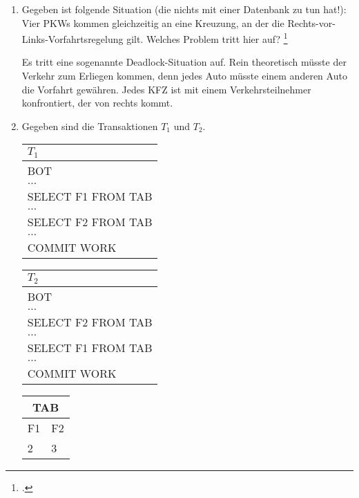 \documentclass{bschlangaul-aufgabe}
\begin{document}

\begin{enumerate}


\item Gegeben ist folgende Situation (die nichts mit einer Datenbank zu
tun hat!): Vier PKWs kommen gleichzeitig an eine Kreuzung, an der die
Rechts-vor-Links-Vorfahrtsregelung gilt. Welches Problem tritt hier auf?
\footcite[Aufgabe 6]{db:ab:6}

\begin{bAntwort}
Es tritt eine sogenannte Deadlock-Situation auf. Rein
theoretisch müsste der Verkehr zum Erliegen kommen, denn jedes Auto
müsste einem anderen Auto die Vorfahrt gewähren. Jedes KFZ ist mit einem
Verkehrsteilnehmer konfrontiert, der von rechts kommt.
\end{bAntwort}


\item Gegeben sind die Transaktionen $T_1$ und $T_2$.

\begin{center}
\begin{tabular}{|l|}
\hline
$T_1$ \\\hline
BOT \\\hline
$\dots$ \\\hline
SELECT F1 FROM TAB \\\hline
$\dots$ \\\hline
SELECT F2 FROM TAB \\\hline
$\dots$ \\\hline
COMMIT WORK \\\hline
\end{tabular}
%
\begin{tabular}{|l|}
\hline
$T_2$ \\\hline
BOT \\\hline
$\dots$ \\\hline
SELECT F2 FROM TAB \\\hline
$\dots$ \\\hline
SELECT F1 FROM TAB \\\hline
$\dots$ \\\hline
COMMIT WORK \\\hline
\end{tabular}
%
\begin{tabular}{|l|l|}
\hline
\multicolumn{2}{|c|}{TAB} \\\hline
F1 & F2 \\\hline
2 & 3 \\\hline
\end{tabular}
\end{center}


\end{enumerate}
\end{document}
